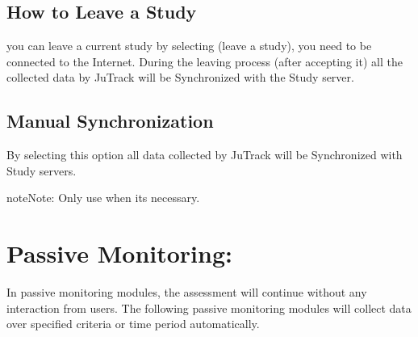 \documentclass[letterpaper,10pt,english]{sphinxmanual}
\begin{document}
\begin{DUlineblock}{0em}
\item[] 
\end{DUlineblock}


\subsection{How to Leave a Study}
\label{\detokenize{JuTrack_Social:how-to-leave-a-study}}
you can leave a current study by selecting  (leave a study), you need to be connected to the Internet.
During the leaving process (after accepting it) all the collected data by JuTrack will be Synchronized with the Study server.

\begin{DUlineblock}{0em}
\item[] 
\end{DUlineblock}


\begin{DUlineblock}{0em}
\item[] 
\end{DUlineblock}


\subsection{Manual Synchronization}
\label{\detokenize{JuTrack_Social:manual-synchronization}}
By selecting this option all data collected by JuTrack will be Synchronized with Study servers.

\begin{sphinxadmonition}{note}{Note:}
Only use when its necessary.
\end{sphinxadmonition}

\begin{DUlineblock}{0em}
\item[] 
\end{DUlineblock}


\section{Passive Monitoring:}
\label{\detokenize{JuTrack_Social:passive-monitoring}}
In passive monitoring modules, the assessment will continue without any interaction from users.
The following passive monitoring modules will collect data over specified criteria or time period automatically.
\end{document}
